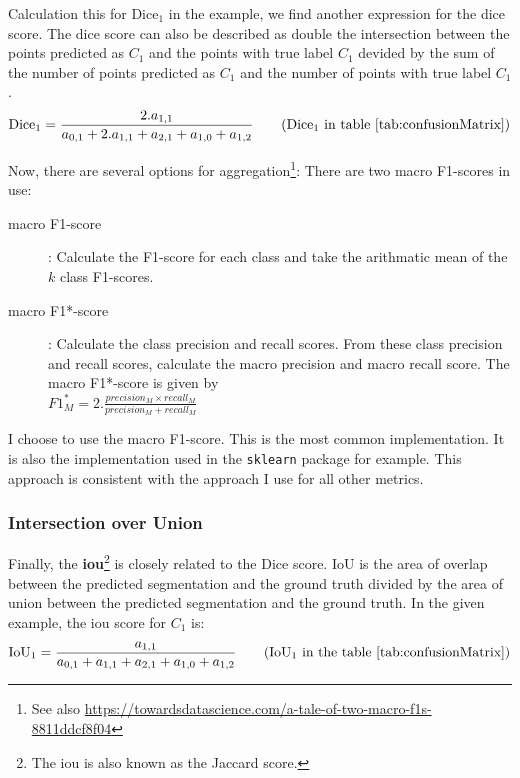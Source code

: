 Calculation this for Dice$_1$ in the example, we find another expression for the dice score.
The dice score can also be described as double the intersection between the points predicted as $C_1$ and the points with true label $C_1$ devided by the sum of the number of points predicted as $C_1$ and the number of points with true label $C_1$.
\begin{equation}
    \text{Dice}_1 = \frac{2.a_{1,1}}{a_{0,1} + 2.a_{1,1} + a_{2, 1} + a_{1,0} + a_{1,2}} \tag{Dice$_1$ in table \ref{tab:confusionMatrix}}
\end{equation}

Now, there are several options for aggregation\footnote{See also \url{https://towardsdatascience.com/a-tale-of-two-macro-f1s-8811ddcf8f04}}:
There are two macro F1-scores in use:
\begin{description}
    \item[macro F1-score]: Calculate the F1-score for each class and take the arithmatic mean of the $k$ class F1-scores.
    \item[macro F1*-score]: Calculate the class precision and recall scores. From these class precision and recall scores, calculate the macro precision and macro recall score. 
    The macro F1*-score is given by\\ $F1_M^*=2 . \frac{precision_M \times recall_M }{precision_M + recall_M }$
\end{description}

I choose to use the macro F1-score. This is the most common implementation. It is also the implementation used in the \texttt{sklearn} package for example.
This approach is consistent with the approach I use for all other metrics. \\

\subsubsection{Intersection over Union}

Finally, the \textbf{\acrfull{iou}}\footnote{The \acrshort{iou} is also known as the Jaccard score.} is closely related to the Dice score.
IoU is the area of overlap between the predicted segmentation and the ground truth divided by the area of union between the predicted segmentation and the ground truth.
In the given example, the \acrshort{iou} score for $C_1$ is:
\begin{equation}
    \text{IoU}_1 = \frac{a_{1,1}}{a_{0,1}+a_{1,1}+a_{2,1}+a_{1,0}+a_{1,2}} \tag{IoU$_1$ in the table \ref{tab:confusionMatrix}}
\end{equation}


